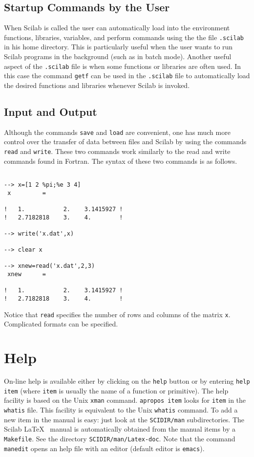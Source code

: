 \subsection{Startup Commands by the User}
\label{s5.2}

	When Scilab is called the user can automatically load
into the environment functions, libraries, variables, and perform
commands using the the file {\tt .scilab} in his home directory.  
This is particularly useful when the user wants to run Scilab programs
in the background (such as in batch mode).  Another useful aspect
of the {\tt .scilab} file is when some functions or libraries
are often used.  In this case the command {\tt getf} can be used
in the {\tt .scilab} file to automatically load the desired 
functions and libraries whenever Scilab is invoked.

\subsection{Input and Output}
\label{s5.3}

	Although the commands {\tt save} and {\tt load} are
convenient, one has much more control over the transfer of
data between files and Scilab by using the commands 
{\tt read}
and {\tt write}.  
These two commands work similarly to the
read and write commands found in Fortran.  The syntax of these
two commands is as follows.  
\begin{verbatim}
 
--> x=[1 2 %pi;%e 3 4]
 x         =
 
!   1.           2.    3.1415927 !
!   2.7182818    3.    4.        !
 
--> write('x.dat',x)
 
--> clear x
 
--> xnew=read('x.dat',2,3)
 xnew      =
 
!   1.           2.    3.1415927 !
!   2.7182818    3.    4.        !
\end{verbatim}
Notice that {\tt read} specifies the number of rows and columns
of the matrix {\tt x}.
Complicated formats can be specified. 

\section{Help}
On-line help is available either by clicking on the {\tt help}
button or by entering {\tt help item} (where {\tt item} is usually the 
name of a function or primitive). The help facility is based on the 
Unix {\tt xman} command. {\tt apropos item} looks for {\tt item} 
in the {\tt whatis} file. This facility is equivalent to the Unix 
{\tt whatis} command. To add a new item in the manual is easy: just
look at the {\tt SCIDIR/man} subdirectories.
The Scilab \LaTeX~  manual is automatically obtained from the
manual items by a {\tt Makefile}. 
See the directory {\tt SCIDIR/man/Latex-doc}. Note that the command
{\tt manedit} opens an help file with an editor (default editor
is {\tt emacs}).



